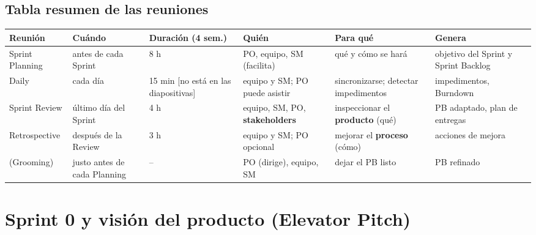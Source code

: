 \documentclass[11pt,a4paper,oneside,openany]{report}
\newcommand{\extra}{\textcolor{mdaOrange}{\small[no está en las diapositivas]}}
\begin{document}
\subsection{Tabla resumen de las reuniones}
\begin{center}\footnotesize
\setlength{\tabcolsep}{3pt}
\begin{tabular}{p{2.1cm}p{2.3cm}p{1.6cm}p{3.1cm}p{2.7cm}p{2.6cm}}
\toprule
\textbf{Reunión} & \textbf{Cuándo} & \textbf{Duración (4 sem.)} & \textbf{Quién} & \textbf{Para qué} & \textbf{Genera} \\ \midrule
Sprint Planning & antes de cada Sprint & 8 h & PO, equipo, SM (facilita) & qué y cómo se hará & objetivo del Sprint y Sprint Backlog \\
Daily & cada día & 15 min \extra & equipo y SM; PO puede asistir & sincronizarse; detectar impedimentos & impedimentos, Burndown \\
Sprint Review & último día del Sprint & 4 h & equipo, SM, PO, \textbf{stakeholders} & inspeccionar el \textbf{producto} (qué) & PB adaptado, plan de entregas \\
Retrospective & después de la Review & 3 h & equipo y SM; PO opcional & mejorar el \textbf{proceso} (cómo) & acciones de mejora \\
(Grooming) & justo antes de cada Planning & -- & PO (dirige), equipo, SM & dejar el PB listo & PB refinado \\
\bottomrule
\end{tabular}
\end{center}

\section{Sprint 0 y visión del producto (Elevator Pitch)}
\end{document}
